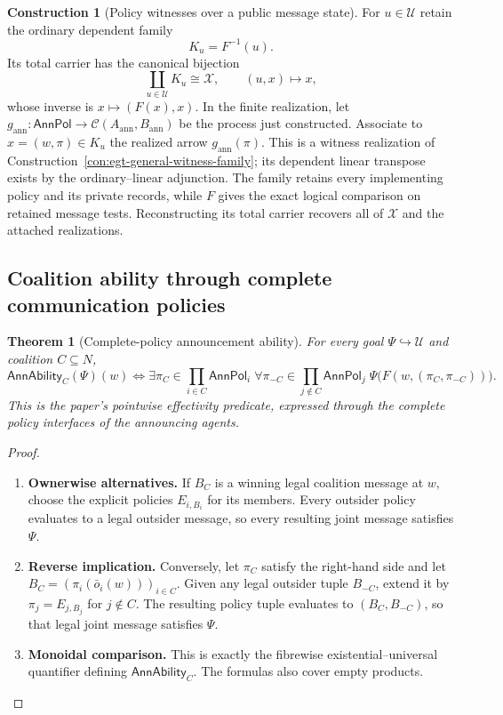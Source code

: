 \documentclass[11pt,a4paper]{article}
\numberwithin{equation}{section}
\newtheorem{theorem}{Theorem}[section]
\theoremstyle{definition}
\newtheorem{construction}[construction]{Construction}
\theoremstyle{remark}
\theoremstyle{plain}
\begin{document}
\begin{construction}[Policy witnesses over a public message state]
\label{con:egt-announcement-policy-witnesses}
For $u\in\mathcal U$ retain the ordinary dependent family
\[
 K_u=F^{-1}(u).
\]
Its total carrier has the canonical bijection
\[
 \coprod_{u\in\mathcal U}K_u\cong\mathcal X,
 \qquad(u,x)\longmapsto x,
\]
whose inverse is $x\mapsto(F(x),x)$. In the finite realization, let
$g_{\mathrm{ann}}:\mathsf{AnnPol}\to
 \mathcal C(A_{\mathrm{ann}},B_{\mathrm{ann}})$ be the process just
constructed. Associate to $x=(w,\pi)\in K_u$ the realized arrow
$g_{\mathrm{ann}}(\pi)$. This is a witness realization of
Construction~\ref{con:egt-general-witness-family}; its dependent linear
transpose exists by the ordinary--linear adjunction. The family retains
every implementing policy and its private records, while $F$ gives the
exact logical comparison on retained message tests. Reconstructing its total
carrier recovers all of $\mathcal X$ and the attached realizations.
\end{construction}

\subsection{Coalition ability through complete communication policies}

\begin{theorem}[Complete-policy announcement ability]
\label{thm:egt-complete-policy-announcement-ability}
For every goal $\Psi\hookrightarrow\mathcal U$ and coalition $C\subseteq N$,
\[
 \mathsf{AnnAbility}_C(\Psi)(w)
 \iff
 \exists\pi_C\in\prod_{i\in C}\mathsf{AnnPol}_i\;
 \forall\pi_{-C}\in\prod_{j\notin C}\mathsf{AnnPol}_j\;
       \Psi\bigl(F(w,(\pi_C,\pi_{-C}))\bigr).
\]
This is the paper's pointwise effectivity predicate, expressed through
the complete policy interfaces of the announcing agents.
\end{theorem}
\begin{proof}
\leavevmode
\begin{enumerate}[label=\textup{(\arabic*)},leftmargin=*,itemsep=4pt,topsep=3pt]
  \item \textbf{Ownerwise alternatives.} If $B_C$ is a winning legal coalition message at $w$, choose the explicit
policies $E_{i,B_i}$ for its members. Every outsider policy
evaluates to a legal outsider message, so every resulting joint message
satisfies $\Psi$.
  \item \textbf{Reverse implication.} Conversely, let $\pi_C$ satisfy the right-hand side and let
$B_C=(\pi_i(\bar o_i(w)))_{i\in C}$. Given any legal outsider tuple
$B_{-C}$, extend it by
$\pi_j=E_{j,B_j}$ for $j\notin C$. The resulting policy tuple
evaluates to $(B_C,B_{-C})$, so that legal joint message satisfies $\Psi$.
  \item \textbf{Monoidal comparison.} This is exactly the fibrewise existential--universal quantifier defining
$\mathsf{AnnAbility}_C$. The formulas also cover empty products.
\end{enumerate}
\end{proof}
\end{document}
